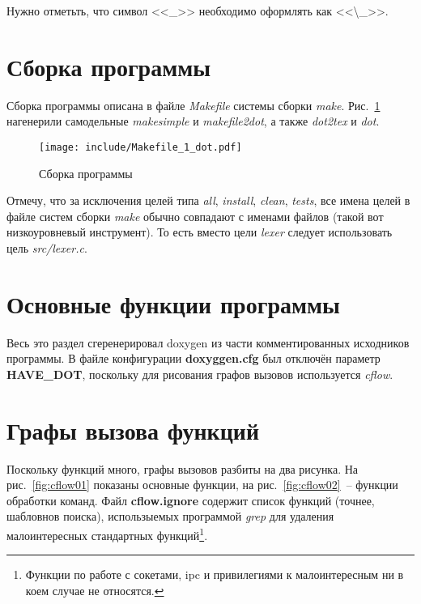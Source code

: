 \documentclass[a4paper,12pt]{report}
\begin{document}
Нужно отметьть, что символ <<\_>> необходимо оформлять как <<\textbackslash\_>>.

\section{Сборка программы}

Сборка программы описана в файле \textit{Makefile} системы сборки \textit{make}. Рис.~\ref{fig:make} нагенерили самодельные \textit{makesimple} и \textit{makefile2dot}, а также \textit{dot2tex} и \textit{dot}.

\begin{figure}
\centering
\texttt{[image: include/Makefile\_1\_dot.pdf]}
\caption{Сборка программы}
\label{fig:make}
\end{figure}

Отмечу, что за исключения целей типа \textit{all}, \textit{install}, \textit{clean}, \textit{tests}, все имена целей в файле систем сборки \textit{make} обычно совпадают с именами файлов (такой вот низкоуровневый инструмент). То есть вместо цели \textit{lexer} следует использовать цель \textit{src/lexer.c}.

\section{Основные функции программы}

Весь это раздел сгеренерировал doxygen из части комментированных исходников программы. В файле конфигурации \textbf{doxyggen.cfg} был отключён параметр \textbf{HAVE\_DOT}, поскольку для рисования графов вызовов используется \textit{cflow}.

%
%
%
%
%
%
%
%

\section{Графы вызова функций}

Поскольку функций много, графы вызовов разбиты на два рисунка. На рис.~\ref{fig:cflow01} показаны основные функции, на рис.~\ref{fig:cflow02}~-- функции обработки команд. Файл \textbf{cflow.ignore} содержит список функций (точнее, шабловнов поиска), использыемых программой \textit{grep} для удаления малоинтересных стандартных функций\footnote{Функции по работе с сокетами, ipc и привилегиями к малоинтересным ни в коем случае не относятся.}.
\end{document}
